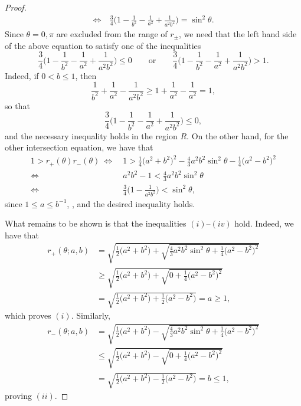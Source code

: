 \documentclass[pdftex]{sigma}
\numberwithin{equation}{section}
\begin{document}
\begin{proof}
\begin{align*}
 \Longleftrightarrow \ {}& \frac{3}{4}\biggl(1 -\frac{1}{b^2} - \frac{1}{a^2} + \frac{1}{a^2b^2}\biggr) = \sin^2\theta.
 \end{align*}
Since $\theta = 0,\pi$ are excluded from the range of $r_{\pm}$, we need that the left hand side of the above equation to satisfy one of the inequalities
 \begin{equation*}
 \frac{3}{4}\biggl(1 -\frac{1}{b^2} - \frac{1}{a^2} + \frac{1}{a^2b^2}\biggr) \leq 0 \qquad \text{or} \qquad
 \frac{3}{4}\biggl(1 -\frac{1}{b^2} - \frac{1}{a^2} + \frac{1}{a^2b^2}\biggr) > 1.
 \end{equation*}
Indeed, if $0< b \leq 1$, then
 \begin{equation*}
 \frac{1}{b^2} + \frac{1}{a^2} - \frac{1}{a^2b^2} \geq 1 + \frac{1}{a^2} - \frac{1}{a^2} = 1,
 \end{equation*}
so that
 \begin{equation*}
 \frac{3}{4}\biggl(1 -\frac{1}{b^2} - \frac{1}{a^2} + \frac{1}{a^2b^2}\biggr) \leq 0,
 \end{equation*}
and the necessary inequality holds in the region $R$. On the other hand, for the other intersection equation, we have that
 \begin{align*}
 1 > r_{+}(\theta)r_{-}(\theta) \ \Longleftrightarrow \ {}& 1 > \frac{1}{4}\bigl(a^2+b^2\bigr)^2 - \frac{4}{3}a^2b^2\sin^2\theta - \frac{1}{4}\bigl(a^2-b^2\bigr)^2\\
 \Longleftrightarrow \ {}& a^2b^2 - 1 < \frac{4}{3} a^2b^2\sin^2\theta\\
 \Longleftrightarrow \ {}& \frac{3}{4}\biggl(1 - \frac{1}{a^2b^2}\biggr) < \sin^2\theta,
 \end{align*}
since $1 \leq a \leq b^{-1}$, , and the desired inequality holds.

What remains to be shown is that the inequalities $(i)$--$(iv)$ hold. Indeed, we have that
 \begin{align*}
 r_+(\theta;a,b) &{}= \sqrt{\frac{1}{2}\bigl(a^2 + b^2\bigr) + \sqrt{\frac{4}{3}a^2b^2\sin^2\theta + \frac{1}{4}\bigl(a^2-b^2\bigr)^2}} \\
 &{}\geq \sqrt{\frac{1}{2}\bigl(a^2 + b^2\bigr) + \sqrt{0 + \frac{1}{4}\bigl(a^2-b^2\bigr)^2}} \\
 &{}= \sqrt{\frac{1}{2}\bigl(a^2 + b^2\bigr) + \frac{1}{2}\bigl(a^2-b^2\bigr)} = a \geq 1,
 \end{align*}
which proves $(i)$. Similarly,
 \begin{align*}
 r_-(\theta;a,b) &{}= \sqrt{\frac{1}{2}\bigl(a^2 + b^2\bigr) - \sqrt{\frac{4}{3}a^2b^2\sin^2\theta + \frac{1}{4}\bigl(a^2-b^2\bigr)^2}} \\
 &{}\leq \sqrt{\frac{1}{2}\bigl(a^2 + b^2\bigr) - \sqrt{0 + \frac{1}{4}\bigl(a^2-b^2\bigr)^2}} \\
 &{}= \sqrt{\frac{1}{2}\bigl(a^2 + b^2\bigr) - \frac{1}{2}\bigl(a^2-b^2\bigr)} = b \leq 1,
 \end{align*}
proving $(ii)$.


\end{proof}
\end{document}
